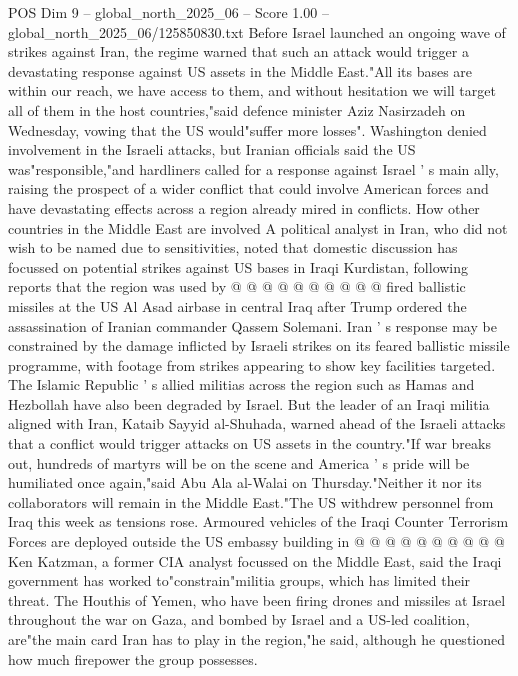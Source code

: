 \begin{textsample}{POS Dim 9 – global\_north\_2025\_06 – Score 1.00 – global\_north\_2025\_06/125850830.txt}  \label{ex:f9_pos_353}
Before Israel launched an ongoing wave of strikes against Iran, the regime warned that such an attack would trigger a devastating response against US assets in the Middle East."All its bases are within our reach, we have access to them, and without hesitation we will target all of them in the host countries,"said defence minister Aziz Nasirzadeh on Wednesday, vowing that the US would"suffer more losses".
Washington denied involvement in the Israeli attacks, but Iranian officials said the US was"responsible,"and hardliners called for a response against Israel ' s main ally, raising the prospect of a wider conflict that could involve American forces and have devastating effects across a region already mired in conflicts.
How other countries in the Middle East are involved A political analyst in Iran, who did not wish to be named due to sensitivities, noted that domestic discussion has focussed on potential strikes against US bases in Iraqi Kurdistan, following reports that the region was used by @ @ @ @ @ @ @ @ @ @ fired ballistic missiles at the US Al Asad airbase in central Iraq after Trump ordered the assassination of Iranian commander Qassem Solemani.
Iran ' s response may be constrained by the damage inflicted by Israeli strikes on its feared ballistic missile programme, with footage from strikes appearing to show key facilities targeted.
The Islamic Republic ' s allied militias across the region such as Hamas and Hezbollah have also been degraded by Israel.
But the leader of an Iraqi militia aligned with Iran, Kataib Sayyid al-Shuhada, warned ahead of the Israeli attacks that a conflict would trigger attacks on US assets in the country."If war breaks out, hundreds of martyrs will be on the scene and America ' s pride will be humiliated once again,"said Abu Ala al-Walai on Thursday."Neither it nor its collaborators will remain in the Middle East."The US withdrew personnel from Iraq this week as tensions rose.
Armoured vehicles of the Iraqi Counter Terrorism Forces are deployed outside the US embassy building in @ @ @ @ @ @ @ @ @ @ Ken Katzman, a former CIA analyst focussed on the Middle East, said the Iraqi government has worked to"constrain"militia groups, which has limited their threat.
The Houthis of Yemen, who have been firing drones and missiles at Israel throughout the war on Gaza, and bombed by Israel and a US-led coalition, are"the main card Iran has to play in the region,"he said, although he questioned how much firepower the group possesses.

\end{textsample}
